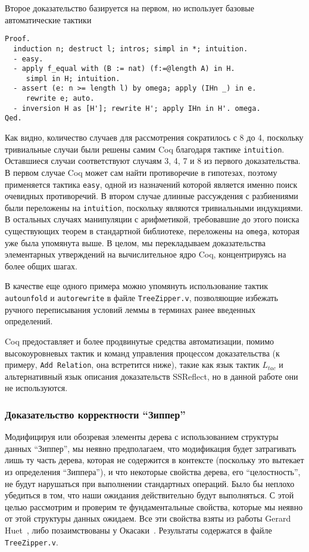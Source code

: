 Второе доказательство базируется на первом, но использует базовые автоматические тактики
\begin{Verbatim}[fontsize=\small]
Proof.
  induction n; destruct l; intros; simpl in *; intuition.
  - easy.
  - apply f_equal with (B := nat) (f:=@length A) in H.
     simpl in H; intuition.
  - assert (e: n >= length l) by omega; apply (IHn _) in e.
     rewrite e; auto.
  - inversion H as [H']; rewrite H'; apply IHn in H'. omega.
Qed.
\end{Verbatim}

Как видно, количество случаев для рассмотрения сократилось с 8 до 4, поскольку тривиальные случаи были решены самим Coq благодаря тактике \texttt{intuition}.  Оставшиеся случаи соответствуют случаям 3, 4, 7 и 8 из первого доказательства. В первом случае Coq может сам найти противоречие в гипотезах, поэтому применяется тактика \texttt{easy}, одной из назначений которой является именно поиск очевидных противоречий. В втором случае длинные рассуждения с разбиениями были переложены на \texttt{intuition}, поскольку являются тривиальными индукциями. В остальных случаях манипуляции с арифметикой, требовавшие до этого поиска существующих теорем в стандартной библиотеке, переложены на \texttt{omega}, которая уже была упомянута выше. В целом, мы перекладываем доказательства элементарных утверждений на вычислительное ядро Coq, концентрируясь на более общих шагах.

В качестве еще одного примера можно упомянуть использование тактик \texttt{autounfold} и \texttt{autorewrite} в файле \texttt{TreeZipper.v}, позволяющие избежать ручного переписывания условий леммы в терминах ранее введенных определений.

Coq предоставляет и более продвинутые средства автоматизации, помимо высокоуровневых тактик и команд управления процессом доказательства (к примеру, \texttt{Add Relation}, она встретится ниже), такие как язык тактик $L_{tac}$ и альтернативный язык описания доказательств \textsf{SSReflect}, но в данной работе они не используются.

\subsubsection{Доказательство корректности ``Зиппер''}

Модифицируя или обозревая элементы дерева с использованием структуры данных ``Зиппер'', мы неявно предполагаем, что модификация будет затрагивать лишь ту часть дерева, которая не содержится в контексте (поскольку это вытекает из определения ``Зиппера''), и что некоторые свойства дерева, его ``целостность'', не будут нарушаться при выполнении стандартных операций. Было бы неплохо убедиться в том, что наши ожидания действительно будут выполняться. С этой целью рассмотрим и проверим те фундаментальные свойства, которые мы неявно от этой структуры данных ожидаем. Все эти свойства взяты из работы Gerard Huet~\autocite{Huet1997}, либо позаимствованы у Окасаки~\autocite{Okasaki1996}. Результаты содержатся в файле \texttt{TreeZipper.v}.

